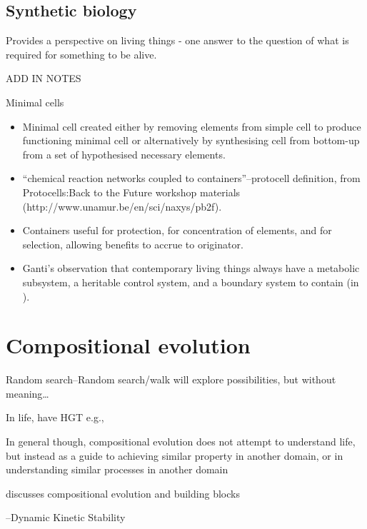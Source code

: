 \subsection{Synthetic biology}\label{synthetic-biology}

Provides a perspective on living things - one answer to the question of what is required for something to be alive.

ADD IN NOTES

Minimal cells

\begin{itemize}
	\item
	      Minimal cell created either by removing elements from simple cell to
	      produce functioning minimal cell or alternatively by synthesising cell
	      from bottom-up from a set of hypothesised necessary elements.
	\item
	      ``chemical reaction networks coupled to containers''--protocell
	      definition, from Protocells:Back to the Future workshop materials
	      (http://www.unamur.be/en/sci/naxys/pb2f).
	\item
	      Containers useful for protection, for concentration of elements, and
	      for selection, allowing benefits to accrue to originator.
	\item
	      Ganti's observation that contemporary living things always have a
	      metabolic subsystem, a heritable control system, and a boundary system
	      to contain (in \autocite{Szathmary:2006ty}).
\end{itemize}

\section{Compositional evolution}

Random search--Random search/walk will explore possibilities, but without meaning\ldots{}

In life, have HGT e.g., \autocite{Ochman2000}

In general though, compositional evolution does not attempt to understand life, but instead as a guide to achieving similar property in another domain, or in understanding similar processes in another domain \autocite{Arthur2009}

\autocite{Watson2002} discusses compositional evolution and building blocks

\autocite{Pross2011}--Dynamic Kinetic Stability

